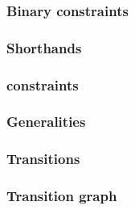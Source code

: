 \subsubsection{Binary constraints}                  \label{hub: system: system flags: binary constraints}             
\subsubsection{Shorthands}                          \label{hub: system: system flags: shorthands}                     
\subsubsection{\blockNumber{} constraints}          \label{hub: system: system flags: block number}                   
\subsubsection{Generalities}                        \label{hub: system: system flags: generalities}                   
\subsubsection{Transitions}                         \label{hub: system: system flags: transitions}                    
\subsubsection{Transition graph}                    \label{hub: system: system flags: transition graph}               
